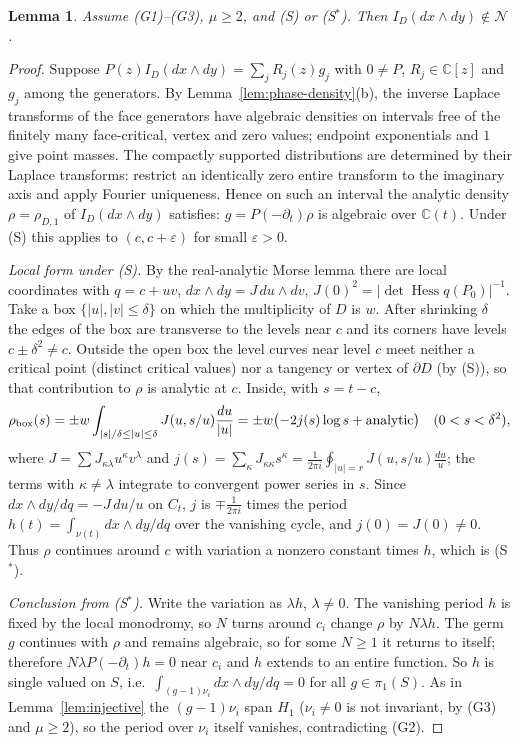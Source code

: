 \documentclass[11pt]{article}
\numberwithin{equation}{section}
\newtheorem{lemma}[lemma]{Lemma}
\theoremstyle{definition}
\theoremstyle{remark}
\newcommand{\C}{\mathbb C}
\newcommand{\Ncal}{\mathcal N}
\begin{document}
\begin{lemma}\label{lem:saddle}
Assume \textup{(G1)--(G3)}, $\mu\ge2$, and \textup{(S)} or \textup{(S$^*$)}. Then
$I_D(dx\wedge dy)\notin\Ncal$.
\end{lemma}
\begin{proof}
Suppose $P(z)I_D(dx\wedge dy)=\sum_jR_j(z)g_j$ with $0\ne P$, $R_j\in\C[z]$ and
$g_j$ among the generators. By Lemma~\ref{lem:phase-density}(b), the inverse Laplace transforms of
the face generators have algebraic densities on intervals free of the
finitely many face-critical, vertex and zero values; endpoint
exponentials and $1$ give point masses.  The compactly supported
distributions are determined by their Laplace transforms: restrict an
identically zero entire transform to the imaginary axis and apply Fourier
uniqueness. Hence on such an interval the analytic density
$\rho=\rho_{D,1}$ of $I_D(dx\wedge dy)$ satisfies:
$g=P(-\partial_t)\rho$ is algebraic over $\C(t)$. Under (S) this applies to
$(c,c+\varepsilon)$ for small $\varepsilon>0$.

\emph{Local form under (S).} By the real-analytic Morse lemma there are local
coordinates with $q=c+uv$, $dx\wedge dy=J\,du\wedge dv$,
$J(0)^2=|\det\operatorname{Hess}q(P_0)|^{-1}$. Take a box
$\{|u|,|v|\le\delta\}$ on which the multiplicity of $D$ is $w$. After shrinking $\delta$ the edges of the box are transverse to the levels near
$c$ and its corners have levels $c\pm\delta^2\ne c$. Outside the open
box the level curves near level $c$ meet neither a critical point (distinct
critical values) nor a tangency or vertex of $\partial D$ (by (S)), so that
contribution to $\rho$ is analytic at $c$. Inside, with $s=t-c$,
\[
 \rho_{\rm box}(s)=\pm w\int_{|s|/\delta\le|u|\le\delta}J(u,s/u)\frac{du}{|u|}
 =\pm w\bigl(-2j(s)\log s+\text{analytic}\bigr)\quad(0<s<\delta^2),
\]
where $J=\sum J_{\kappa\lambda}u^\kappa v^\lambda$ and $j(s)=\sum_\kappa J_{\kappa\kappa}s^\kappa
=\frac1{2\pi i}\oint_{|u|=r}J(u,s/u)\frac{du}u$; the terms with
$\kappa\ne\lambda$ integrate to convergent power series in $s$. Since
$dx\wedge dy/dq=-J\,du/u$ on $C_t$, $j$ is $\mp\frac1{2\pi i}$ times the period
$h(t)=\int_{\nu(t)}dx\wedge dy/dq$ over the vanishing cycle, and $j(0)=J(0)\ne0$.
Thus $\rho$ continues around $c$ with variation a nonzero constant times $h$,
which is (S$^*$).

\emph{Conclusion from (S$^*$).} Write the variation as $\lambda h$, $\lambda\ne0$. The
vanishing period $h$ is fixed by the local monodromy, so $N$ turns around
$c_i$ change $\rho$ by $N\lambda h$. The germ $g$ continues with $\rho$ and
remains algebraic, so for some $N\ge1$ it returns to itself; therefore
$N\lambda P(-\partial_t)h=0$ near $c_i$ and $h$ extends to an entire function. So $h$ is
single valued on $S$, i.e.\ $\int_{(g-1)\nu_i}dx\wedge dy/dq=0$ for all
$g\in\pi_1(S)$. As in Lemma~\ref{lem:injective} the $(g-1)\nu_i$ span $H_1$
($\nu_i\ne0$ is not invariant, by (G3) and $\mu\ge2$), so the period over $\nu_i$
itself vanishes, contradicting (G2).
\end{proof}
\end{document}
